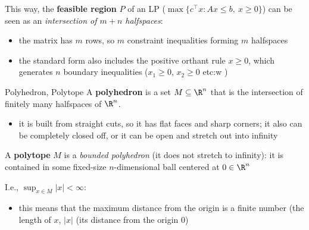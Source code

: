 \documentclass[a4paper, 11pt]{report}
\newcommand{\Rn}{\R^{n}}
\begin{document}
This way, the \textbf{feasible region} $P$ of an LP ($\max \{c^\top x : Ax \leq b, \ x \geq 0 \}$) can be seen as an \textit{intersection of $m+n$ halfspaces}:
\begin{itemize}
    \item the matrix has $m$ rows, so $m$ constraint inequalities forming $m$ halfspaces
    \item the standard form also includes the positive orthant rule $x \geq 0$, which generates $n$ boundary inequalities ($x_{1} \geq 0$, $x_{2} \geq 0$ etc:w
        )
\end{itemize}

\begin{defframe}{Polyhedron, Polytope}{}
    A \textbf{polyhedron} is a set $M \subseteq \Rn$ that is the intersection of finitely many halfspaces of $\Rn$.

    \begin{itemize}
        \item \color{gray} it is built from straight cuts, so it has flat faces and sharp corners; it also can be completely closed off, or it can be open and stretch out into infinity
    \end{itemize}


    A \textbf{polytope} $M$ is a \textit{bounded polyhedron} (it does not stretch to infinity): it is contained in some fixed-size $n$-dimensional ball centered at $0 \in \Rn$

    I.e., $\sup_{x\in M} |x| < \infty$:
    \begin{itemize}
    \item this means that the maximum distance from the origin is a finite number (the length of $x$, $|x|$ (its distance from the origin $0$)
    \end{itemize}
\end{defframe}
\end{document}
